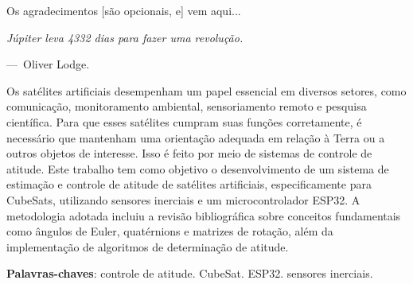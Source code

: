 \documentclass[
	12pt,				%
	openright,			%
	oneside,			%
	a4paper,			%
	english,			%
	brazil				%
	]{abntex2}
\begin{document}
\imprimirfolhaderosto



%


\begin{agradecimentos}
\noindent Os agradecimentos [são opcionais, e] vem aqui...
\end{agradecimentos}

\begin{epigrafe}
    \vspace*{\fill}
\epigraph{\textsl{Júpiter leva 4332 dias para fazer uma revolução.}}{---~Oliver Lodge.}
\end{epigrafe}


\setlength{\absparsep}{18pt} %
\begin{resumo}
Os satélites artificiais desempenham um papel essencial em diversos setores, como comunicação, monitoramento ambiental, sensoriamento remoto e pesquisa científica. Para que esses satélites cumpram suas funções corretamente, é necessário que mantenham uma orientação adequada em relação à Terra ou a outros objetos de interesse. Isso é feito por meio de sistemas de controle de atitude. Este trabalho tem como objetivo o desenvolvimento de um sistema de estimação e controle de atitude de satélites artificiais, especificamente para CubeSats, utilizando sensores inerciais e um microcontrolador ESP32. A metodologia adotada incluiu a revisão bibliográfica sobre conceitos fundamentais como ângulos de Euler, quatérnions e matrizes de rotação, além da implementação de algoritmos de determinação de atitude.


 \textbf{Palavras-chaves}: controle de atitude. CubeSat. ESP32. sensores inerciais.
\end{resumo}
\end{document}
